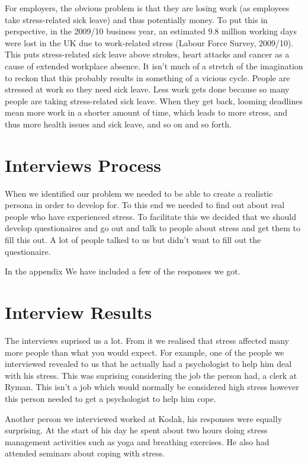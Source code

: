 \documentclass{scrartcl}
\begin{document}
For employers, the obvious problem is that they are losing work (as employees take stress-related sick leave) and thus
potentially money. To put this in perspective, in the 2009/10 business year, an estimated 9.8 million working days
were lost in the UK due to work-related stress (Labour Force Survey, 2009/10).
This puts stress-related sick leave above strokes, heart attacks and
cancer as a cause of extended workplace absence. It isn't much of a stretch of the imagination to reckon that this
probably results in something of a vicious cycle. People are stressed at work so they need sick leave. Less work gets
done because so many people are taking stress-related sick leave. When they get back, looming deadlines mean more work
in a shorter amount of time, which leads to more stress, and thus more health issues and sick leave, and so on and so forth.

\section{Interviews Process}
When we identified our problem we needed to be able to create a realistic persona
in order to develop for. To this end we needed to find out about real people
who have experienced stress. To facilitate this we decided that we should
develop questionaires and go out and talk to people about stress and get them to 
fill this out. A lot of people talked to us but didn't want to fill out the 
questionaire.

In the appendix We have included a few of the responses we got. 

\section{Interview Results}
The interviews suprised us a lot. From it we realised that stress
affected many more people than what you would expect. For example, 
one of the people we interviewed revealed to us that he actually
had a psychologist to help him deal with his stress. This was
suprising considering the job the person had, a clerk at Ryman.
This isn't a job which would normally be considered high stress
however this person needed to get a psychologist to help him cope.

Another person we interviewed worked at Kodak, his responses were 
equally surprising. At the start of his day he spent about two hours
doing stress management activities such as yoga and breathing exercises.
He also had attended seminars about coping with stress.
\end{document}
